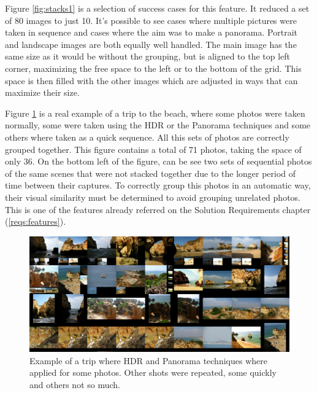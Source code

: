 Figure \ref{fig:stacks1} is a selection of success cases for this feature. It reduced a set of 80 images to just 10. It's possible to see cases where multiple pictures were taken in sequence and cases where the aim was to make a panorama. Portrait and landscape images are both equally well handled. The main image has the same size as it would be without the grouping, but is aligned to the top left corner, maximizing the free space to the left or to the bottom of the grid. This space is then filled with the other images which are adjusted in ways that can maximize their size.

Figure \ref{fig:stacks2} is a real example of a trip to the beach, where some photos were taken normally, some were taken using the \ac{HDR} or the Panorama techniques and some others where taken as a quick sequence. All this sets of photos are correctly grouped together. This figure contains a total of 71 photos, taking the space of only 36.  On the bottom left of the figure, can be see two sets of sequential photos of the same scenes that were not stacked together due to the longer period of time between their captures. To correctly group this photos in an automatic way, their visual similarity must be determined to avoid grouping unrelated photos. This is one of the features already referred on the Solution Requirements chapter (\ref{reqs:features}). 


\begin{figure}[htbp]
	\centering
		\includegraphics[width=\linewidth]{Figures/stacks-mix.png}
	\caption[Real world example of stacking on a trip's photos with HDR and Panorama images.]{Example of a trip where \ac{HDR} and Panorama techniques where applied for some photos. Other shots were repeated, some quickly and others not so much.}
	\label{fig:stacks2}
\end{figure}

